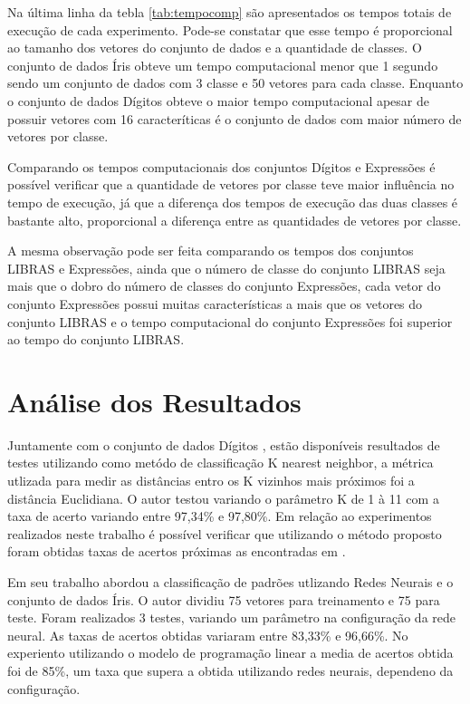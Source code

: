 Na última linha da tebla \ref{tab:tempocomp} são apresentados os tempos totais de execução de cada experimento. Pode-se constatar que esse tempo é proporcional ao tamanho dos vetores do conjunto de dados e a quantidade de classes. O conjunto de dados Íris obteve um tempo computacional menor que 1 segundo sendo um conjunto de dados com 3 classe e 50 vetores para cada classe. Enquanto o conjunto de dados Dígitos obteve o maior tempo computacional apesar de possuir vetores com 16 caracteríticas é o conjunto de dados com maior número de vetores por classe. 

Comparando os tempos computacionais dos conjuntos Dígitos e Expressões é possível verificar que a quantidade de vetores por classe teve maior influência no tempo de execução, já que a diferença dos tempos de execução das duas classes é bastante alto, proporcional a diferença entre as quantidades de vetores por classe. 

A mesma observação pode ser feita comparando os tempos dos conjuntos LIBRAS e Expressões, ainda que o número de classe do conjunto LIBRAS seja mais que o dobro do número de classes do conjunto Expressões, cada vetor do conjunto Expressões possui muitas características a mais que os vetores do conjunto LIBRAS e o tempo computacional do conjunto Expressões foi superior ao tempo do conjunto LIBRAS.

\section{Análise dos Resultados}

Juntamente com o conjunto de dados Dígitos \cite{Digitos}, estão disponíveis resultados de testes utilizando como metódo de classificação K nearest neighbor, a métrica utlizada para medir as distâncias entro os K vizinhos mais próximos foi a distância Euclidiana. O autor testou variando o parâmetro K de 1 à 11 com a taxa de acerto variando entre 97,34\% e 97,80\%. Em relação ao experimentos realizados neste trabalho é possível verificar que utilizando o método proposto foram obtidas taxas de acertos próximas as encontradas em .

Em seu trabalho  abordou a classificação de padrões utlizando Redes Neurais e o conjunto de dados Íris. O autor dividiu 75 vetores para treinamento e 75 para teste. Foram realizados 3 testes, variando um parâmetro na configuração da rede neural. As taxas de acertos obtidas variaram entre 83,33\% e 96,66\%. No experiento utilizando o modelo de programação linear a media de acertos obtida foi de 85\%, um taxa que supera a obtida utilizando redes neurais, dependeno da configuração.

